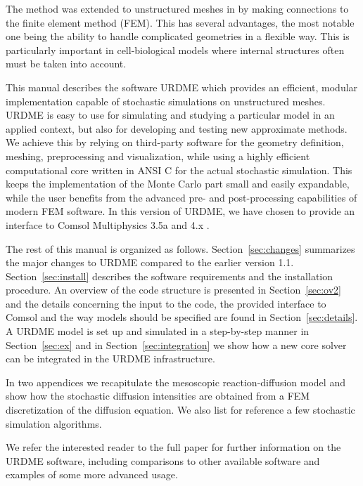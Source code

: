 The method was extended to unstructured meshes in \cite{SPDEPEFHL} by
making connections to the finite element method (FEM). This has
several advantages, the most notable one being the ability to handle
complicated geometries in a flexible way. This is particularly
important in cell-biological models where internal structures often
must be taken into account.

This manual describes the software URDME which provides an efficient,
modular implementation capable of stochastic simulations on
unstructured meshes. URDME is easy to use for simulating and studying
a particular model in an applied context, but also for developing and
testing new approximate methods. We achieve this by relying on
third-party software for the geometry definition, meshing,
preprocessing and visualization, while using a highly efficient
computational core written in ANSI C for the actual stochastic
simulation. This keeps the implementation of the Monte Carlo
part small and easily expandable, while the user benefits from
the advanced pre- and post-processing capabilities of modern FEM
software. In this version of URDME, we have chosen to provide an
interface to Comsol Multiphysics 3.5a and 4.x \cite{COMSOL}.
        
The rest of this manual is organized as
follows. Section~\ref{sec:changes} summarizes the major changes to
URDME compared to the earlier version 1.1. Section~\ref{sec:install}
describes the software requirements and the installation procedure. An
overview of the code structure is presented in Section~\ref{sec:ov2}
and the details concerning the input to the code, the provided
interface to Comsol and the way models should be specified are found
in Section~\ref{sec:details}. A URDME model is set up and simulated in
a step-by-step manner in Section~\ref{sec:ex} and in
Section~\ref{sec:integration} we show how a new core solver can be
integrated in the URDME infrastructure.

In two appendices we recapitulate the mesoscopic reaction-diffusion
model and show how the stochastic diffusion intensities are obtained
from a FEM discretization of the diffusion equation. We also list for
reference a few stochastic simulation algorithms.

We refer the interested reader to the full paper \cite{URDMEpaper} for
further information on the URDME software, including comparisons to
other available software and examples of some more advanced usage.
